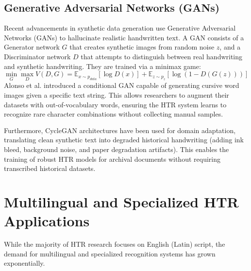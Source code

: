 \subsection{Generative Adversarial Networks (GANs)}
Recent advancements in synthetic data generation use Generative Adversarial Networks (GANs) to hallucinate realistic handwritten text. A GAN consists of a Generator network $G$ that creates synthetic images from random noise $z$, and a Discriminator network $D$ that attempts to distinguish between real handwriting and synthetic handwriting. They are trained via a minimax game:
\begin{equation}
    \min_G \max_D V(D, G) = \mathbb{E}_{x \sim p_{data}}[\log D(x)] + \mathbb{E}_{z \sim p_z}[\log(1 - D(G(z)))]
\end{equation}
Alonso et al. introduced a conditional GAN capable of generating cursive word images given a specific text string. This allows researchers to augment their datasets with out-of-vocabulary words, ensuring the HTR system learns to recognize rare character combinations without collecting manual samples.

Furthermore, CycleGAN architectures have been used for domain adaptation, translating clean synthetic text into degraded historical handwriting (adding ink bleed, background noise, and paper degradation artifacts). This enables the training of robust HTR models for archival documents without requiring transcribed historical datasets.

\section{Multilingual and Specialized HTR Applications}
While the majority of HTR research focuses on English (Latin) script, the demand for multilingual and specialized recognition systems has grown exponentially.

